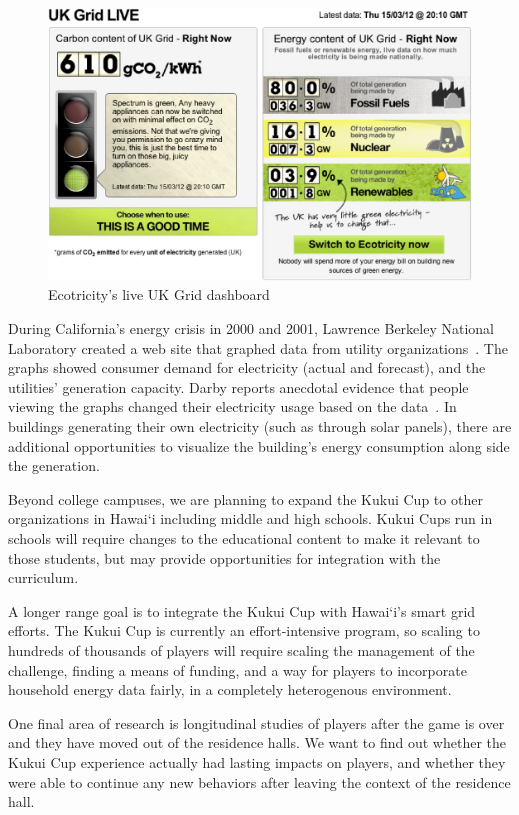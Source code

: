 \documentclass[10pt, conference, compsocconf]{IEEEtran-old}
\newcommand{\Hawaii}{Hawai`i\xspace}
\begin{document}
\begin{figure}[!tb]
	\centering
		\includegraphics[width=\columnwidth]{ecotricity-dashboard}
		\caption{Ecotricity's live UK Grid dashboard}
		\label{fig:ecotricity-dashboard}
\end{figure}

During California's energy crisis in 2000 and 2001, Lawrence Berkeley National Laboratory created a web site that graphed data from utility organizations~\cite{Bartholomew2008Current-Energy}. The graphs showed consumer demand for electricity (actual and forecast), and the utilities' generation capacity. Darby reports anecdotal evidence that people viewing the graphs changed their electricity usage based on the data~\cite{darby-review-2006}. In buildings generating their own electricity (such as through solar panels), there are additional opportunities to visualize the building's energy consumption along side the generation.

Beyond college campuses, we are planning to expand the Kukui Cup to other organizations in \Hawaii including middle and high schools. Kukui Cups run in schools will require changes to the educational content to make it relevant to those students, but may provide opportunities for integration with the curriculum.

A longer range goal is to integrate the Kukui Cup with \Hawaii's smart grid efforts. The Kukui Cup is currently an effort-intensive program, so scaling to hundreds of thousands of players will require scaling the management of the challenge, finding a means of funding, and a way for players to incorporate household energy data fairly, in a completely heterogenous environment.

One final area of research is longitudinal studies of players after the game is over and they have moved out of the residence halls. We want to find out whether the Kukui Cup experience actually had lasting impacts on players, and whether they were able to continue any new behaviors after leaving the context of the residence hall.
\end{document}

